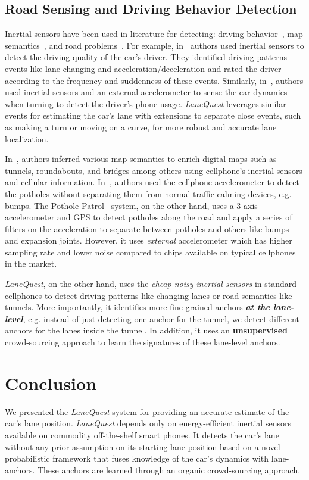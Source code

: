 \documentclass[10pt, conference, compsocconf]{IEEEtran}
\def \sys {\textit{LaneQuest}}
\begin{document}
\subsection{Road Sensing and Driving Behavior Detection}
Inertial sensors have been used in literature for detecting: driving behavior~\cite{fazeen2012safe,wang2013sensing,singh2013using}, map semantics~\cite{aly_map14,sheikh2014demonstrating}, and road problems~\cite{pothole,mednis2011real}. For example, in~\cite{fazeen2012safe,singh2013using} authors used inertial sensors to detect the driving quality of the car's driver. They identified driving patterns events like lane-changing and acceleration/deceleration and rated the driver according to the frequency and suddenness of these events. Similarly, in~\cite{wang2013sensing}, authors used inertial sensors and an external accelerometer to sense the car dynamics when turning to detect the driver's phone usage. \sys{} leverages similar events for estimating the car's lane with extensions to separate close events, such as making a turn or moving on a curve, for more robust and accurate lane localization.

In~\cite{aly_map14}, authors inferred various map-semantics to enrich digital maps such as tunnels, roundabouts, and bridges among others using cellphone's inertial sensors and cellular-information.
In~\cite{mednis2011real}, authors used the cellphone accelerometer to detect the potholes without separating them from normal traffic calming devices, e.g. bumps. The Pothole Patrol~\cite{pothole} system, on the other hand, uses a 3-axis accelerometer and GPS to detect potholes along the road and apply a series of filters on the acceleration to separate between potholes and others like bumps and expansion joints. However, it uses \emph{external} accelerometer which has higher sampling rate and lower noise compared to chips available on typical cellphones in the market.

\sys{}, on the other hand, uses the \emph{cheap noisy inertial sensors} in standard cellphones to detect driving patterns like changing lanes or road semantics like tunnels. More importantly, it identifies more fine-grained anchors \textbf{\emph{at the lane-level}}, e.g. instead of just detecting one anchor for the tunnel, we detect different anchors for the lanes inside the tunnel. In addition, it uses an \textbf{unsupervised} crowd-sourcing approach to learn the signatures of these lane-level anchors.


\section{Conclusion}\label{sec:conclude}We presented the \sys{} system for providing an accurate estimate of the car's lane position. \sys{} depends only on energy-efficient inertial sensors available on commodity off-the-shelf smart phones. It detects the car's lane without any prior assumption on its starting lane position based on a novel probabilistic framework that fuses knowledge of the car's dynamics with lane-anchors. These anchors are learned through an organic crowd-sourcing approach.
\end{document}

